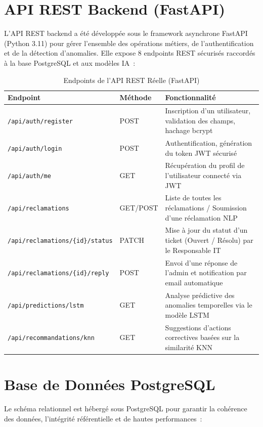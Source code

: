 \documentclass[12pt,a4paper]{report}
\begin{document}
\section{API REST Backend (FastAPI)}

L'API REST backend a été développée sous le framework asynchrone FastAPI (Python 3.11) pour gérer l'ensemble des opérations métiers, de l'authentification et de la détection d'anomalies. Elle expose 8 endpoints REST sécurisés raccordés à la base PostgreSQL et aux modèles IA~:

\begin{table}[H]
\centering
\caption{Endpoints de l'API REST Réelle (FastAPI)}
\begin{tabularx}{\textwidth}{|l|l|X|}
\hline
\textbf{Endpoint} & \textbf{Méthode} & \textbf{Fonctionnalité} \\
\hline
\texttt{/api/auth/register} & POST & Inscription d'un utilisateur, validation des champs, hachage bcrypt \\
\hline
\texttt{/api/auth/login} & POST & Authentification, génération du token JWT sécurisé \\
\hline
\texttt{/api/auth/me} & GET & Récupération du profil de l'utilisateur connecté via JWT \\
\hline
\texttt{/api/reclamations} & GET/POST & Liste de toutes les réclamations / Soumission d'une réclamation NLP \\
\hline
\texttt{/api/reclamations/\{id\}/status} & PATCH & Mise à jour du statut d'un ticket (Ouvert / Résolu) par le Responsable IT \\
\hline
\texttt{/api/reclamations/\{id\}/reply} & POST & Envoi d'une réponse de l'admin et notification par email automatique \\
\hline
\texttt{/api/predictions/lstm} & GET & Analyse prédictive des anomalies temporelles via le modèle LSTM \\
\hline
\texttt{/api/recommandations/knn} & GET & Suggestions d'actions correctives basées sur la similarité KNN \\
\hline
\end{tabularx}
\end{table}

\section{Base de Données PostgreSQL}

Le schéma relationnel est hébergé sous PostgreSQL pour garantir la cohérence des données, l'intégrité référentielle et de hautes performances~:
\end{document}
